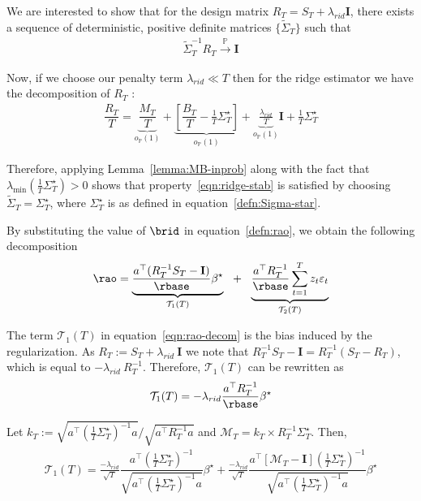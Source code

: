 \documentclass[11pt,letterpaper]{article}
\newcommand{\Prob}{\mathbb{P}}
\newcommand{\rpen}{\lambda_{rid}}
\newcommand{\BT}{{\Sigma^\star_T}}
\newcommand{\Id}{\mathbf{I}}
\newcommand{\z}{z}
\theoremstyle{plain}
\theoremstyle{definition}  %
\begin{document}
\noindent We are interested to show that for the design matrix $R_T = S_T + \rpen \Id$, there exists a sequence of deterministic, positive definite matrices $\{\tilde{\Sigma}_T \}$ such that
\begin{align}\label{eqn:ridge-stab}
    \tilde{\Sigma}^{-1}_T R_T \xrightarrow{\Prob} \Id
 \end{align}

\noindent Now, if we choose our penalty term $\lambda_{rid} \ll T$ then for the ridge estimator we have the decomposition of $R_T$ :
\begin{align}
    \dfrac{R_T}{T} 
     = \underbrace{\dfrac{M_T}{T}}_{o_{\Prob}(1)} + \underbrace{\left[\dfrac{B_T}{T}-\frac{1}{T} \BT \right]}_{o_{\Prob}(1)} + \underbrace{\frac{\rpen}{T}}_{o_\Prob(1)} \Id+ \frac{1}{T} \BT  
\end{align}

\noindent Therefore, applying Lemma~\ref{lemma:MB-inprob} along with the fact that $\lambda_{\min} \left(\frac{1}{T} \BT \right) > 0$ shows that property~\eqref{eqn:ridge-stab} is satisfied by choosing $\tilde{\Sigma}_T = \BT$, where $\BT$ is as defined in equation~\eqref{defn:Sigma-star}.

\noindent By substituting the value of $\brid$ in equation~\eqref{defn:rao}, we obtain the following decomposition
\begin{align}\label{eqn:rao-decom}
   \rao = \underbrace{\dfrac{a^\top (R_T^{-1}S_T - \Id)}{\rbase}  \beta^\star}_{\mathcal{T}_1(T)}  \ \  + \  \ \underbrace{\dfrac{a^\top R_T^{-1}}{\rbase}  \sum^T_{t=1} \z_t \varepsilon_t}_{\mathcal{T}_2(T)}
\end{align}

\noindent The term $\mathcal{T}_1(T)$ in equation~\eqref{eqn:rao-decom} is the bias induced by the regularization. As $R_T := S_T + \rpen \ \Id$ we note that $R_T^{-1}S_T - \Id = R_T^{-1}(S_T - R_T)$, which is equal to $-\rpen \ R_T^{-1}$. Therefore, $\mathcal{T}_1(T)$ can be rewritten as
\begin{align}\label{eqn:taoo-simp}
  \mathcal{T}_1(T) 
  = -\rpen \dfrac{a^\top R_T^{-1}}{\rbase}  \beta^\star
\end{align}

\noindent Let $k_T := \sqrt{a^\top  \left( \frac{1}{T} \BT \right)^{-1}  a} / \sqrt{a^\top  R_T^{-1} a}$ and $\mathcal{M}_T = k_T \times  R_T^{-1}\BT$. Then, 
\begin{align}\label{eqn:taoo-decom}
   \mathcal{T}_1(T)  
   =\frac{-\rpen}{\sqrt{T}} \dfrac{a^\top  \left( \frac{1}{T} \BT \right)^{-1}}{\sqrt{a^\top  \left( \frac{1}{T} \BT \right)^{-1}  a}}  \beta^\star
   + \frac{-\rpen}{\sqrt{T}} \dfrac{a^\top [\mathcal{M}_T - \Id] \left( \frac{1}{T} \BT  \right)^{-1} }{\sqrt{a^\top  \left( \frac{1}{T} \BT \right)^{-1}  a}}  \beta^\star
\end{align}
\end{document}
